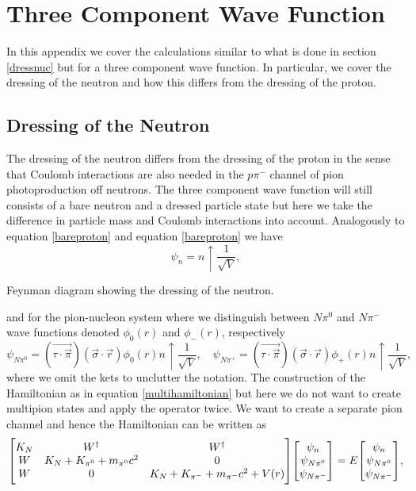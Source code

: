 \appendix
\chapter{Three Component Wave Function}\label{ThreeComponentWavefunction}
In this appendix we cover the calculations similar to what is done in section \ref{dressnuc} but for a three component wave function. In particular, we cover the dressing of the neutron and how this differs from the dressing of the proton. 
\section{Dressing of the Neutron}\label{sec:dressingofneutron}
The dressing of the neutron differs from the dressing of the proton in the sense that Coulomb interactions are also needed in the $p\pi^-$ channel of pion photoproduction off neutrons. The three component wave function will still consists of a bare neutron and a dressed particle state but here we take the difference in particle mass and Coulomb interactions into account. Analogously to equation \eqref{bareproton} and equation \eqref{bareproton} we have
\begin{equation} \label{bareneutron}
	\psi_n = n \uparrow \frac{1}{\sqrt{V}},
\end{equation}
  \begin{marginfigure}
	\centering
	
	\caption{Feynman diagram showing the dressing of the neutron.}
	\label{DressingOfNeutron}
\end{marginfigure} 
and for the pion-nucleon system where we distinguish between $N\pi^0$ and $N\pi^-$ wave functions denoted $\phi_0(r)$ and $\phi_{-}(r)$, respectively
\begin{equation} \label{neutronpionnuc}
	\psi_{N\pi^0}=(\vec{\tau\cdot\vec{\pi}})(\vec{\sigma}\cdot\vec{r})\phi_0(r) n\uparrow\frac{1}{\sqrt{V}}, \quad \psi_{N\pi^+}=(\vec{\tau\cdot\vec{\pi}})(\vec{\sigma}\cdot\vec{r})\phi_+(r) n\uparrow\frac{1}{\sqrt{V}},
\end{equation}
where we omit the kets to unclutter the notation. The construction of the Hamiltonian as in equation \eqref{multihamiltonian} but here we do not want to create multipion states and apply the operator twice. We want to create a separate pion channel and hence the Hamiltonian can be written as
\begin{equation}
	\mqty[K_{N} & W^\dagger & W^\dagger \\ W & K_{N}+K_{\pi^0}+m_{\pi^0}c^2 & 0 \\ W & 0 & K_{N}+K_{\pi^-}+m_{\pi^-}c^2+V(r)]\mqty[\psi_n \\ \psi_{N\pi^0} \\ \psi_{N\pi^-}] = E \mqty[\psi_n \\ \psi_{N\pi^0} \\ \psi_{N\pi^-}],
\end{equation}

